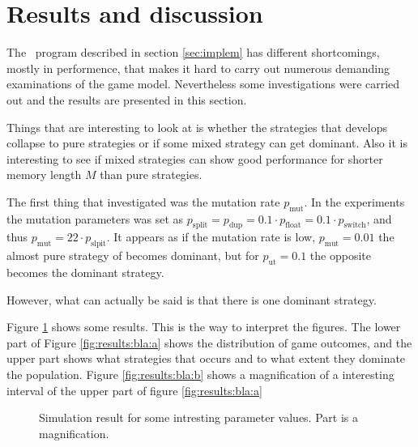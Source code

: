 \section{Results and discussion}\label{sec:results}
The \matlab\ program described in section \ref{sec:implem} has different shortcomings, mostly in performence, that makes it hard to carry out numerous demanding examinations of the game model. Nevertheless some investigations were carried out and the results are presented in this section.\mypar

Things that are interesting to look at is whether the strategies that develops collapse to pure strategies or if some mixed strategy can get dominant. Also it is interesting to see if mixed strategies can show good performance for shorter memory length $M$ than pure strategies.\mypar

The first thing that investigated was the mutation rate $p_{\textrm{mut}}$. In the experiments the mutation parameters was set as $p_{\textrm{split}} = p_{\textrm{dup}} = 0.1\cdot p_{\textrm{float}} = 0.1\cdot p_{\textrm{switch}}$, and thus $p_{\textrm{mut}} = 22 \cdot p_{\textrm{slpit}}$. It appears as if the mutation rate is low, $p_{\textrm{mut}}=0.01$ the almost pure strategy of  becomes dominant, but for $p_{\textrm{ut}}=0.1$ the opposite  becomes the dominant strategy.\mypar

However, what can actually be said is that there is one dominant strategy.\mypar

Figure \ref{fig:results:bla} shows some results. This is the way to interpret the figures. The lower part of Figure \ref{fig:results:bla:a} shows the distribution of game outcomes, and the upper part shows what strategies that occurs and to what extent they dominate the population. Figure \ref{fig:results:bla:b} shows a magnification of a interesting interval of the upper part of figure \ref{fig:results:bla:a}

\begin{figure}[!htbp]\centering


\caption{Simulation result for some intresting parameter values. Part  is a magnification.}
\label{fig:results:bla}
\end{figure}


